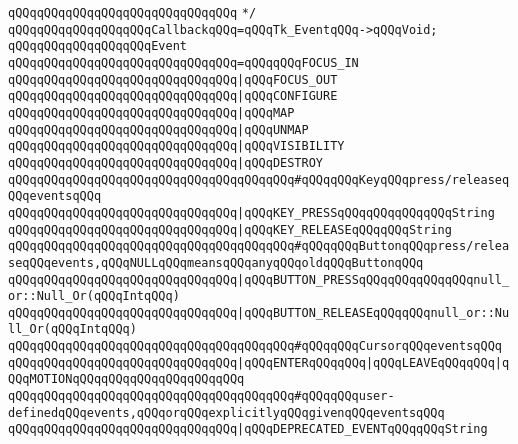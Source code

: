 \verb|qQQqqQQqqQQqqQQqqQQqqQQqqQQqqQQq|\newline
\verb|*/|\newline
\newline
\verb|qQQqqQQqqQQqqQQqqQQqCallbackqQQq=qQQqTk_EventqQQq->qQQqVoid;|\newline
\newline
\verb|qQQqqQQqqQQqqQQqqQQqEvent|\newline
\verb|qQQqqQQqqQQqqQQqqQQqqQQqqQQqqQQq=qQQqqQQqFOCUS_IN|\newline
\verb|qQQqqQQqqQQqqQQqqQQqqQQqqQQqqQQq|\verb#|qQQqFOCUS_OUT#\newline
\verb|qQQqqQQqqQQqqQQqqQQqqQQqqQQqqQQq|\verb#|qQQqCONFIGURE#\newline
\verb|qQQqqQQqqQQqqQQqqQQqqQQqqQQqqQQq|\verb#|qQQqMAP#\newline
\verb|qQQqqQQqqQQqqQQqqQQqqQQqqQQqqQQq|\verb#|qQQqUNMAP#\newline
\verb|qQQqqQQqqQQqqQQqqQQqqQQqqQQqqQQq|\verb#|qQQqVISIBILITY#\newline
\verb|qQQqqQQqqQQqqQQqqQQqqQQqqQQqqQQq|\verb#|qQQqDESTROY#\newline
\verb|qQQqqQQqqQQqqQQqqQQqqQQqqQQqqQQqqQQqqQQq#qQQqqQQqKeyqQQqpress/releaseqQQqeventsqQQq|\newline
\verb|qQQqqQQqqQQqqQQqqQQqqQQqqQQqqQQq|\verb#|qQQqKEY_PRESSqQQqqQQqqQQqqQQqString#\newline
\verb|qQQqqQQqqQQqqQQqqQQqqQQqqQQqqQQq|\verb#|qQQqKEY_RELEASEqQQqqQQqString#\newline
\verb|qQQqqQQqqQQqqQQqqQQqqQQqqQQqqQQqqQQqqQQq#qQQqqQQqButtonqQQqpress/releaseqQQqevents,qQQqNULLqQQqmeansqQQqanyqQQqoldqQQqButtonqQQq|\newline
\verb|qQQqqQQqqQQqqQQqqQQqqQQqqQQqqQQq|\verb#|qQQqBUTTON_PRESSqQQqqQQqqQQqqQQqnull_or::Null_Or(qQQqIntqQQq)#\newline
\verb|qQQqqQQqqQQqqQQqqQQqqQQqqQQqqQQq|\verb#|qQQqBUTTON_RELEASEqQQqqQQqnull_or::Null_Or(qQQqIntqQQq)#\newline
\verb|qQQqqQQqqQQqqQQqqQQqqQQqqQQqqQQqqQQqqQQq#qQQqqQQqCursorqQQqeventsqQQq|\newline
\verb|qQQqqQQqqQQqqQQqqQQqqQQqqQQqqQQq|\verb#|qQQqENTERqQQqqQQq|qQQqLEAVEqQQqqQQq|qQQqMOTIONqQQqqQQqqQQqqQQqqQQqqQQq#\newline
\verb|qQQqqQQqqQQqqQQqqQQqqQQqqQQqqQQqqQQqqQQq#qQQqqQQquser-definedqQQqevents,qQQqorqQQqexplicitlyqQQqgivenqQQqeventsqQQq|\newline
\verb|qQQqqQQqqQQqqQQqqQQqqQQqqQQqqQQq|\verb#|qQQqDEPRECATED_EVENTqQQqqQQqString#\newline

